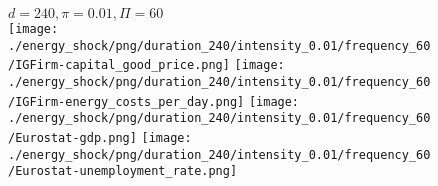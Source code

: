 \begin{figure}[ht!]
\centering\leavevmode
\begin{minipage}{17cm}
\centering\leavevmode
{$d=240, \pi=0.01, \Pi=60$}\\
\texttt{[image: ./energy\_shock/png/duration\_240/intensity\_0.01/frequency\_60/IGFirm-capital\_good\_price.png]}
\texttt{[image: ./energy\_shock/png/duration\_240/intensity\_0.01/frequency\_60/IGFirm-energy\_costs\_per\_day.png]}
\texttt{[image: ./energy\_shock/png/duration\_240/intensity\_0.01/frequency\_60/Eurostat-gdp.png]}
\texttt{[image: ./energy\_shock/png/duration\_240/intensity\_0.01/frequency\_60/Eurostat-unemployment\_rate.png]}
\end{minipage}
\end{figure}

